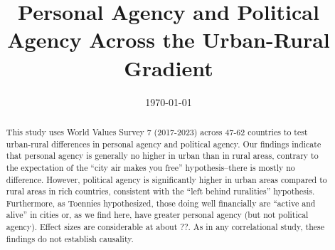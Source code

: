 \documentclass[10pt, letterpaper]{article}
\date{{}\today \hspace{.2in}\xxivtime}
\title{  
  Personal Agency and Political Agency Across the Urban-Rural Gradient  
}
\author{
}
\begin{document}

\maketitle
\vspace{-.4in}
\begin{center}

\end{center}


\begin{abstract}
  \noindent This study uses World Values Survey 7 (2017-2023) across 47-62
  countries to test urban-rural differences in personal agency and political
  agency. Our findings indicate that personal agency is generally no higher in
  urban than in rural areas, contrary to the expectation of the ``city air makes
  you free'' hypothesis--there is mostly no difference. However, political
  agency is significantly higher in urban areas compared to rural areas in rich
  countries, consistent with the ``left behind ruralities''
  hypothesis. Furthermore, as Toennies hypothesized, those doing well financially are ``active and alive'' in cities or, as we find here, have greater personal agency (but not political agency). Effect sizes are considerable at about ??. As in any correlational study, these findings do not establish causality. 
\end{abstract}
\vspace{.15in} 
\vspace{.25in} 

\end{document}
